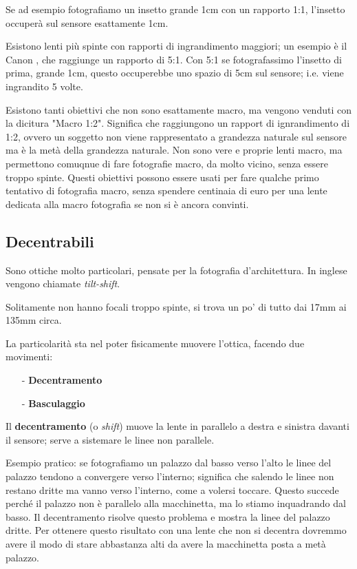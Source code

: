 Se ad esempio fotografiamo un insetto grande 1cm con un rapporto 1:1, l'insetto occuperà sul sensore esattamente 1cm.

Esistono lenti più spinte con rapporti di ingrandimento maggiori; un esempio è il Canon , che raggiunge un rapporto di 5:1. Con 5:1 se fotografassimo l'insetto di prima, grande 1cm, questo occuperebbe uno spazio di 5cm sul sensore; i.e. viene ingrandito 5 volte.

Esistono tanti obiettivi che non sono esattamente macro, ma vengono venduti con la dicitura "Macro 1:2". Significa che raggiungono un rapport di ignrandimento di 1:2, ovvero un soggetto non viene rappresentato a grandezza naturale sul sensore ma è la metà della grandezza naturale. Non sono vere e proprie lenti macro, ma permettono comuqnue di fare fotografie macro, da molto vicino, senza essere troppo spinte. Questi obiettivi possono essere usati per fare qualche primo tentativo di fotografia macro, senza spendere centinaia di euro per una lente dedicata alla macro fotografia se non si è ancora convinti.


\subsection{Decentrabili} \label{subsec:lentidecentrabili}
Sono ottiche molto particolari, pensate per la fotografia d'architettura. In inglese vengono chiamate \textit{tilt-shift}.

Solitamente non hanno focali troppo spinte, si trova un po' di tutto dai 17mm ai 135mm circa.

La particolarità sta nel poter fisicamente muovere l'ottica, facendo due movimenti:
\begin{itemize}
    \item[-] \textbf{Decentramento}
    \item[-] \textbf{Basculaggio}
\end{itemize}

Il \textbf{decentramento} (o \textit{shift}) muove la lente in parallelo a destra e sinistra davanti il sensore; serve a sistemare le linee non parallele.

Esempio pratico: se fotografiamo un palazzo dal basso verso l'alto le linee del palazzo tendono a convergere verso l'interno; significa che salendo le linee non restano dritte ma vanno verso l'interno, come a volersi toccare. Questo succede perché il palazzo non è parallelo alla macchinetta, ma lo stiamo inquadrando dal basso. Il decentramento risolve questo problema e mostra la linee del palazzo dritte.
Per ottenere questo risultato con una lente che non si decentra dovremmo avere il modo di stare abbastanza alti da avere la macchinetta posta a metà palazzo.

